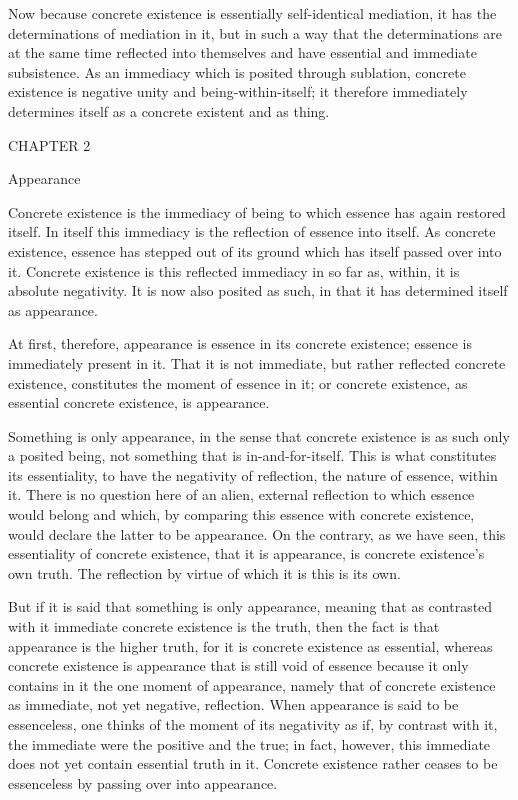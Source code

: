 Now because concrete existence is
essentially self-identical mediation,
it has the determinations of mediation in it,
but in such a way that the determinations are
at the same time reflected into themselves
and have essential and immediate subsistence.
As an immediacy which is posited through sublation,
concrete existence is negative unity and being-within-itself;
it therefore immediately determines itself
as a concrete existent and as thing.

CHAPTER 2

Appearance

Concrete existence is the immediacy of being
to which essence has again restored itself.
In itself this immediacy is the reflection of essence into itself.
As concrete existence, essence has stepped out of its ground
which has itself passed over into it.
Concrete existence is this reflected immediacy in so far
as, within, it is absolute negativity.
It is now also posited as such,
in that it has determined itself as appearance.

At first, therefore, appearance is essence in its concrete existence;
essence is immediately present in it.
That it is not immediate, but rather reflected concrete existence,
constitutes the moment of essence in it;
or concrete existence, as essential concrete existence,
is appearance.

Something is only appearance, in the sense that
concrete existence is as such only a posited being,
not something that is in-and-for-itself.
This is what constitutes its essentiality,
to have the negativity of reflection,
the nature of essence, within it.
There is no question here of an alien,
external reflection to which essence would belong
and which, by comparing this essence with concrete existence,
would declare the latter to be appearance.
On the contrary, as we have seen, this essentiality of concrete existence,
that it is appearance, is concrete existence's own truth.
The reflection by virtue of which it is this is its own.

But if it is said that something is only appearance,
meaning that as contrasted with it immediate concrete existence is the truth,
then the fact is that appearance is the higher truth,
for it is concrete existence as essential,
whereas concrete existence is appearance that is still void of essence
because it only contains in it the one moment of appearance,
namely that of concrete existence as immediate, not yet negative, reflection.
When appearance is said to be essenceless,
one thinks of the moment of its negativity as if,
by contrast with it, the immediate were the positive and the true;
in fact, however, this immediate does not yet contain essential truth in it.
Concrete existence rather ceases to be essenceless
by passing over into appearance.

